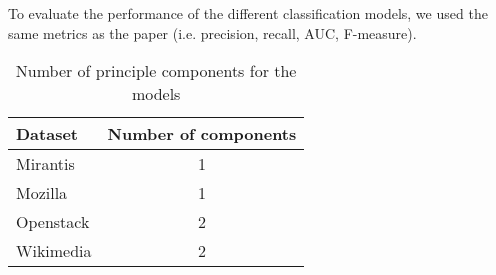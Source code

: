 To evaluate the performance of the different classification models, we used the 
same metrics as the paper (i.e. precision, recall, AUC, F-measure).

\begin{table}[h]
  \caption{Number of principle components for the models}
  \label{table:pca}
    \centering
    \begin{tabular}{|l|c|}
    \hline
        Dataset   & Number of components \\ \hline
        Mirantis  & 1 \\ \hline
        Mozilla   & 1 \\ \hline
        Openstack & 2 \\ \hline
        Wikimedia & 2 \\ \hline
    \end{tabular}
\end{table}
